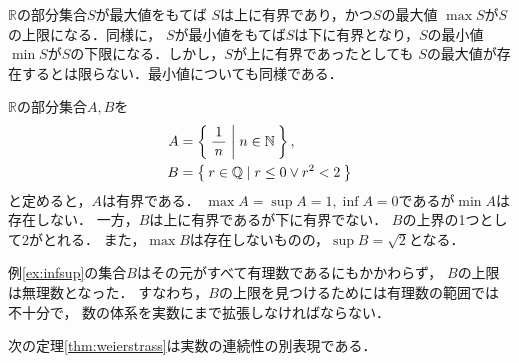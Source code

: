     $\mathbb{R}$の部分集合$S$が最大値をもてば
    $S$は上に有界であり，かつ$S$の最大値
    $\max S$が$S$の上限になる．同様に，
    $S$が最小値をもてば$S$は下に有界となり，$S$の最小値
    $\min S$が$S$の下限になる．しかし，$S$が上に有界であったとしても
    $S$の最大値が存在するとは限らない．最小値についても同様である．

    \begin{ex} \label{ex:infsup}
      $\mathbb{R}$の部分集合$A,  B$を
      \begin{align*}
        A & = \Set{ {{\, 1 \,}\over{\, n \,}} | n \in \mathbb{N} } , \\
        B & = \Set{ r \in \mathbb{Q} \mid r \leq 0 \lor r^2 <2 }
      \end{align*}
      と定めると，$A$は有界である．
      $\max A = \sup A = 1 ,  \inf A =0$であるが$\min A$は存在しない．
      一方，$B$は上に有界であるが下に有界でない．
      $B$の上界の1つとして$2$がとれる．
      また，$\max B$は存在しないものの，$\sup B = \sqrt{2}$となる．
    \end{ex}

    例\ref{ex:infsup}の集合$B$はその元がすべて有理数であるにもかかわらず，
    $B$の上限は無理数となった．
    すなわち，$B$の上限を見つけるためには有理数の範囲では不十分で，
    数の体系を実数にまで拡張しなければならない．

    次の定理\ref{thm:weierstrass}は実数の連続性の別表現である．
    
